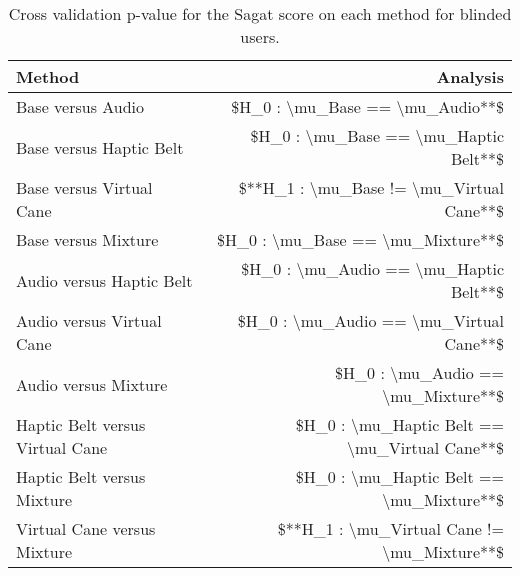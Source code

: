 
\begin{table}[!htb]
\centering
\caption{Cross validation p-value for the Sagat score on each method for blinded users.}
\label{tab:lsd_sagat_avg}
\begin{tabular}{lr}
\toprule
                         Method &                                      Analysis \\
\midrule
              Base versus Audio &               \$H\_0 : \textbackslash mu\_Base == \textbackslash mu\_Audio**\$ \\
        Base versus Haptic Belt &         \$H\_0 : \textbackslash mu\_Base == \textbackslash mu\_Haptic Belt**\$ \\
       Base versus Virtual Cane &      \$**H\_1 : \textbackslash mu\_Base != \textbackslash mu\_Virtual Cane**\$ \\
            Base versus Mixture &             \$H\_0 : \textbackslash mu\_Base == \textbackslash mu\_Mixture**\$ \\
       Audio versus Haptic Belt &        \$H\_0 : \textbackslash mu\_Audio == \textbackslash mu\_Haptic Belt**\$ \\
      Audio versus Virtual Cane &       \$H\_0 : \textbackslash mu\_Audio == \textbackslash mu\_Virtual Cane**\$ \\
           Audio versus Mixture &            \$H\_0 : \textbackslash mu\_Audio == \textbackslash mu\_Mixture**\$ \\
Haptic Belt versus Virtual Cane & \$H\_0 : \textbackslash mu\_Haptic Belt == \textbackslash mu\_Virtual Cane**\$ \\
     Haptic Belt versus Mixture &      \$H\_0 : \textbackslash mu\_Haptic Belt == \textbackslash mu\_Mixture**\$ \\
    Virtual Cane versus Mixture &   \$**H\_1 : \textbackslash mu\_Virtual Cane != \textbackslash mu\_Mixture**\$ \\
\bottomrule
\end{tabular}
\end{table}

